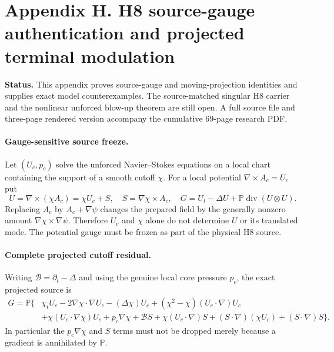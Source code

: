 \clearpage
\section*{Appendix H. H8 source-gauge authentication and projected terminal modulation}
\noindent\textbf{Status.} This appendix proves source-gauge and moving-projection identities and supplies exact model counterexamples. The source-matched singular H8 carrier and the nonlinear unforced blow-up theorem are still open. A full source file and three-page rendered version accompany the cumulative 69-page research PDF.

\paragraph{Gauge-sensitive source freeze.}
Let $(U_c,p_c)$ solve the unforced Navier--Stokes equations on a local chart containing the support of a smooth cutoff $\chi$. For a local potential $\nabla\times A_c=U_c$ put
\[
U=\nabla\times(\chi A_c)=\chi U_c+S,\quad
S=\nabla\chi\times A_c,\quad
G=U_t-\Delta U+\mathbb P\operatorname{div}(U\otimes U).
\]
Replacing $A_c$ by $A_c+\nabla\psi$ changes the prepared field by the generally nonzero amount $\nabla\chi\times\nabla\psi$. Therefore $U_c$ and $\chi$ alone do not determine $U$ or its translated mode. The potential gauge must be frozen as part of the physical H8 source.

\paragraph{Complete projected cutoff residual.}
Writing $\mathcal B=\partial_t-\Delta$ and using the genuine local core pressure $p_c$, the exact projected source is
\begin{align*}
G=\mathbb P\big\{&
\chi_t U_c-2\nabla\chi\cdot\nabla U_c-(\Delta\chi)U_c+
(\chi^2-\chi)(U_c\cdot\nabla)U_c\\
&+\chi(U_c\cdot\nabla\chi)U_c+p_c\nabla\chi+
\mathcal B S+\chi(U_c\cdot\nabla)S
+(S\cdot\nabla)(\chi U_c)+(S\cdot\nabla)S\big\}.
\end{align*}
In particular the $p_c\nabla\chi$ and $S$ terms must not be dropped merely because a gradient is annihilated by $\mathbb P$.

